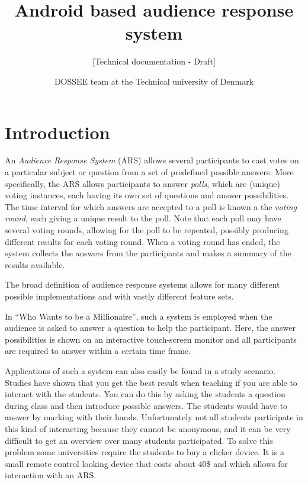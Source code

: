 \documentclass{acm_proc_article-sp}
\begin{document}
\title{Android based audience response system}
\subtitle{[Technical documentation - Draft]
}

\author{
\alignauthor DOSSEE team at the Technical university of Denmark
}


\maketitle

\begin{abstract}
\end{abstract}
\section{Introduction}
\label{sec:introduction}
An \textit{Audience Response System} (ARS) allows several participants to cast votes on a particular subject or question from a set of predefined possible answers. More specifically, the ARS allows participants to answer \textit{polls}, which are (unique) voting instances, each having its own set of questions and answer possibilities. The time interval for which answers are accepted to a poll is known a the \textit{voting round}, each giving a unique result to the poll. Note that each poll may have several voting rounds, allowing for the poll to be repeated, possibly producing different results for each voting round. When a voting round has ended, the system collects the answers from the participants and makes a summary of the results available. 

The broad definition of audience response systems allows for many different possible implementations and with vastly different feature sets.

In “Who Wants to be a Millionaire”, such a system is employed when the audience is asked to answer a question to help the participant. Here, the answer possibilities is shown on an interactive touch-screen monitor and all participants are required to answer within a certain time frame.

Applications of such a system can also easily be found in a study scenario. Studies have shown that you get the best result when teaching if you are able to interact with the students. You can do this by asking the students a question during class and then introduce possible answers. The students would have to answer by marking with their hands.  Unfortunately not all students participate in this kind of interacting because they cannot be anonymous, and it can be very difficult to get an overview over many students participated. To solve this problem some universities require the students to buy a clicker device. It is a small remote control looking device that costs about 40\$ and which allows for interaction with an ARS. 
\end{document}
